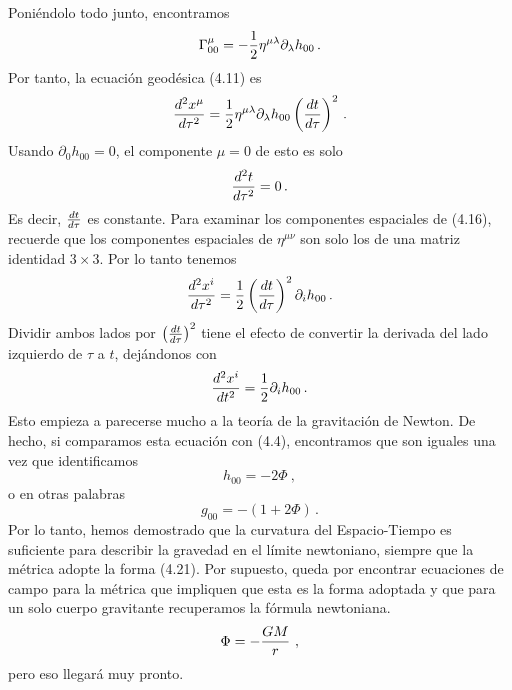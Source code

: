 \documentclass[11pt,b5paper,openany,twoside]{book}
\newcommand{\mn}{{\mu\nu}}
\newcommand{\p}[1]{{\partial_{#1}}}
\begin{document}
Poniéndolo todo junto, encontramos
\begin{equation}
\Gamma^\mu_{00}= - {1\over 2} \eta^{\mu\lambda}\p\lambda h_{00}
\,.\label{4.15}
\end{equation}
Por tanto, la ecuación geodésica (4.11) es
\begin{equation}
{{d^2 x^\mu}\over{d\tau^2}}={1\over 2} \eta^{\mu\lambda}
\p\lambda h_{00} \left({{d t}\over{d\tau}}\right)^2\,.\label{4.16}
\end{equation}
Usando $\p0 h_{00}=0$, el componente $\mu=0$ de esto es solo
\begin{equation}
{{d^2 t}\over{d\tau^2}}=0\,.\label{4.17}
\end{equation}
Es decir, ${{dt}\over{d\tau}}$ es constante.
Para examinar los componentes espaciales de (4.16), recuerde que los componentes espaciales de $\eta^\mn$ son solo los de una matriz identidad $3\times 3$.
Por lo tanto tenemos
\begin{equation}
{{d^2 x^i}\over{d\tau^2}}={1\over 2}\left({{d t}\over{d\tau}}
\right)^2 \p{i} h_{00} \,.\label{4.18}
\end{equation}
Dividir ambos lados por $\left({{d t}\over{d\tau}}\right)^2$ tiene el efecto de convertir la derivada del lado izquierdo de $\tau$ a $t$, dejándonos con
\begin{equation}
{{d^2 x^i}\over{d t^2}}={1\over 2}\p{i} h_{00} \,.\label{4.19}
\end{equation}
Esto empieza a parecerse mucho a la teoría de la gravitación de Newton.
De hecho, si comparamos esta ecuación con (4.4), encontramos que son iguales una vez que identificamos
\begin{equation}
h_{00} = -2\Phi\ ,\label{4.20}
\end{equation}
o en otras palabras
\begin{equation}
g_{00} = -(1+2\Phi)\,.\label{4.21}
\end{equation}
Por lo tanto, hemos demostrado que la curvatura del Espacio-Tiempo es suficiente para describir la gravedad en el límite newtoniano, siempre que la métrica adopte la forma (4.21).
Por supuesto, queda por encontrar ecuaciones de campo para la métrica que impliquen que esta es la forma adoptada y que para un solo cuerpo gravitante recuperamos la fórmula newtoniana.
\begin{equation}
\Phi = -{{GM}\over r}\ ,\label{4.22}
\end{equation}
pero eso llegará muy pronto.
\end{document}
